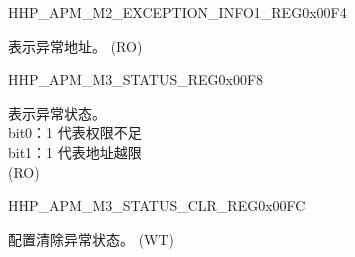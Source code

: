 \begin{register}{H}{HP\_APM\_M2\_EXCEPTION\_INFO1\_REG}{0x00F4}\label{regdesc:HPAPMM2EXCEPTIONINFO1REG}
%
\regnewline%
\begin{regdesc}\begin{reglist}
\label{fielddesc:HPAPMM2EXCEPTIONADDR}\item [HP\_APM\_M2\_EXCEPTION\_ADDR] 表示异常地址。 (RO)
\end{reglist}\end{regdesc}
\end{register}


\begin{register}{H}{HP\_APM\_M3\_STATUS\_REG}{0x00F8}\label{regdesc:HPAPMM3STATUSREG}
%
%
\regnewline%
\begin{regdesc}\begin{reglist}
\label{fielddesc:HPAPMM3EXCEPTIONSTATUS}\item [HP\_APM\_M3\_EXCEPTION\_STATUS] 表示异常状态。 \\
bit0：1 代表权限不足 \\
bit1：1 代表地址越限  \\ (RO)
\end{reglist}\end{regdesc}
\end{register}


\begin{register}{H}{HP\_APM\_M3\_STATUS\_CLR\_REG}{0x00FC}\label{regdesc:HPAPMM3STATUSCLRREG}
%
%
\regnewline%
\begin{regdesc}\begin{reglist}
\label{fielddesc:HPAPMM3REGIONSTATUSCLR}\item [HP\_APM\_M3\_REGION\_STATUS\_CLR] 配置清除异常状态。 (WT)
\end{reglist}\end{regdesc}
\end{register}


